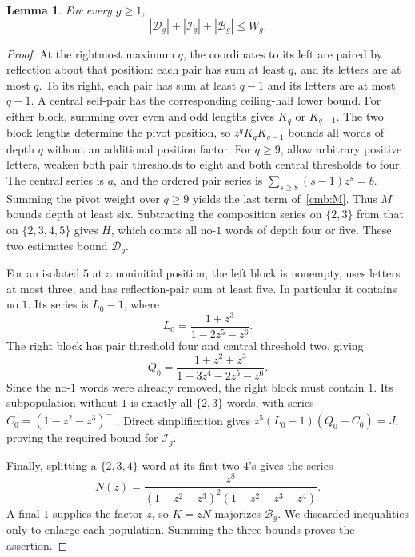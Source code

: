 \documentclass[11pt]{amsart}
\newtheorem{lemma}[theorem]{Lemma}
\theoremstyle{definition}
\theoremstyle{remark}
\numberwithin{equation}{section}
\begin{document}
\begin{lemma}\label{cmb:majorant}
For every $g\ge1$,
\[
 |\mathcal D_g|+|\mathcal I_g|+|\mathcal B_g|\le W_g.
\]
\end{lemma}
\begin{proof}
At the rightmost maximum $q$, the coordinates to its left are paired by
reflection about that position: each pair has sum at least $q$, and its
letters are at most $q$. To its right, each pair has sum at least $q-1$
and its letters are at most $q-1$. A central self-pair has the corresponding
ceiling-half lower bound. For either block, summing over even and odd
lengths gives $K_q$ or $K_{q-1}$. The two block lengths determine the pivot
position, so $z^qK_qK_{q-1}$ bounds all words of depth $q$ without an
additional position factor. For $q\ge9$, allow arbitrary positive letters,
weaken both pair thresholds to eight and both central thresholds to four.
The central series is $a$, and the ordered pair series is
$\sum_{s\ge8}(s-1)z^s=b$. Summing the pivot weight over $q\ge9$ yields
the last term of~\eqref{cmb:M}. Thus $M$ bounds depth at least six.
Subtracting the composition series on $\{2,3\}$ from that on
$\{2,3,4,5\}$ gives $H$, which counts all no-$1$ words of depth four or
five. These two estimates bound $\mathcal D_g$.

For an isolated $5$ at a noninitial position, the left block is nonempty,
uses letters at most three, and has reflection-pair sum at least five.
In particular it contains no $1$. Its series is $L_0-1$, where
\[
 L_0=\frac{1+z^3}{1-2z^5-z^6}.
\]
The right block has pair threshold four and central threshold two, giving
\[
 Q_0=\frac{1+z^2+z^3}{1-3z^4-2z^5-z^6}.
\]
Since the no-$1$ words were already removed, the right block must contain
$1$. Its subpopulation without $1$ is exactly all $\{2,3\}$ words, with
series $C_0=(1-z^2-z^3)^{-1}$. Direct simplification gives
$z^5(L_0-1)(Q_0-C_0)=J$, proving the required bound for $\mathcal I_g$.

Finally, splitting a $\{2,3,4\}$ word at its first two $4$'s gives the series
\begin{equation}\label{cmb:N}
 N(z)=\frac{z^8}{(1-z^2-z^3)^2(1-z^2-z^3-z^4)}.
\end{equation}
A final $1$ supplies the factor $z$, so $K=zN$ majorizes $\mathcal B_g$.
We discarded inequalities only to enlarge each population. Summing the
three bounds proves the assertion.
\end{proof}
\end{document}
